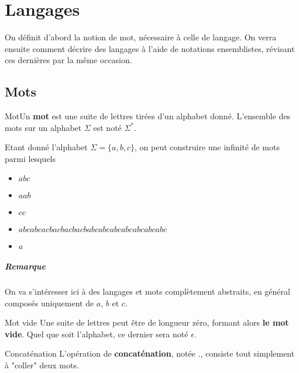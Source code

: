 
\chapter{Langages}
\label{langages}

On définit d'abord la notion de mot, nécessaire à celle de langage. On verra ensuite comment décrire des langages à l'aide de notations ensemblistes, révisant ces dernières par la même occasion.

\section{Mots}

\begin{definition}{Mot}{}Un \textbf{mot} est une suite de lettres tirées d'un alphabet donné. L'ensemble des mots sur un alphabet $\Sigma$ est noté $\Sigma^*$.
\end{definition}

\begin{example}
Etant donné l'alphabet $\Sigma = \{a,b,c\}$, on peut construire une infinité de mots parmi lesquels 

\begin{itemize}
    \item $abc$
    \item $aab$
    \item $cc$
    \item $abcabcacbacbacbacbabcabcabcabcabcabcabc$
    \item $a$
\end{itemize}

\end{example}


\paragraph{Remarque} On va s'intéresser ici à des langages et mots complètement abstraits, en général composés uniquement de $a$, $b$ et $c$.

\begin{definition}{Mot vide}{}
Une suite de lettres peut être de longueur zéro, formant alors \textbf{le mot vide}. Quel que soit l'alphabet, ce dernier sera noté $\epsilon$.
\end{definition}

\begin{definition}{Concaténation}{}
\label{concat}
L'opération de \textbf{concaténation}, notée $.$, consiste tout simplement à "coller" deux mots.
\end{definition}

